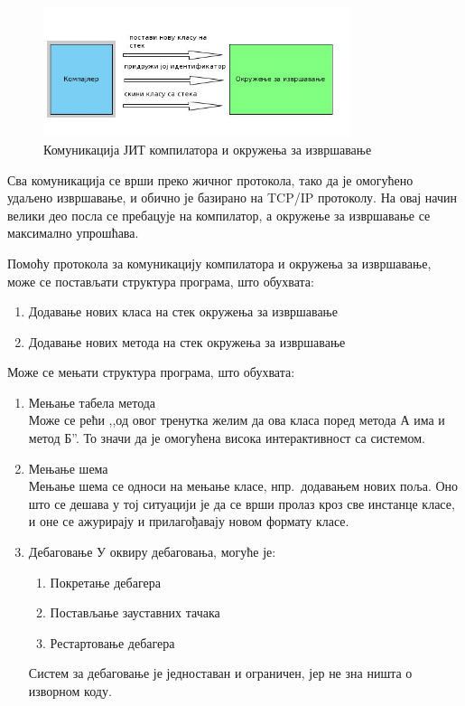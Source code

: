 \documentclass[12pt,oneside]{memoir}
\begin{document}
\begin{figure}[!ht]
  \centering
  \includegraphics[width=0.8\textwidth]{compiler.jpg}
  \caption{Комуникација ЈИТ компилатора и окружења за извршавање}
  \label{fig:komunikacija}
\end{figure}

Сва комуникација се врши преко жичног протокола, тако да је омогућено удаљено извршавање, и обично је базирано на TCP/IP протоколу. На овај начин велики део посла се пребацује на компилатор, а окружење за извршавање се максимално упрошћава.

Помоћу протокола за комуникацију компилатора и окружења за извршавање, може се постављати структура програма, што обухвата: \cite{Dartino}
\begin{enumerate}
\item Додавање нових класа на стек окружења за извршавање
\item Додавање нових метода на стек окружења за извршавање
\end{enumerate}
Може се мењати структура програма, што обухвата:
\begin{enumerate}
\item Мењање табела метода\\
Може се рећи ,,од овог тренутка желим да ова класа поред метода А има и метод Б''. То значи да је омогућена висока интерактивност са системом.
\item Мењање шема\\
Мењање шема се односи на мењање класе, нпр.~додавањем нових поља. Оно што се дешава у тој ситуацији је да се врши пролаз кроз све инстанце класе, и оне се ажурирају и прилагођавају новом формату класе.
\item Дебаговање
У оквиру дебаговања, могуће је:
\begin{enumerate}
\item Покретање дебагера
\item Постављање зауставних тачака
\item Рестартовање дебагера
\end{enumerate}
Систем за дебаговање је једноставан и ограничен, јер не зна ништа о изворном коду.
\end{enumerate}
\end{document}
